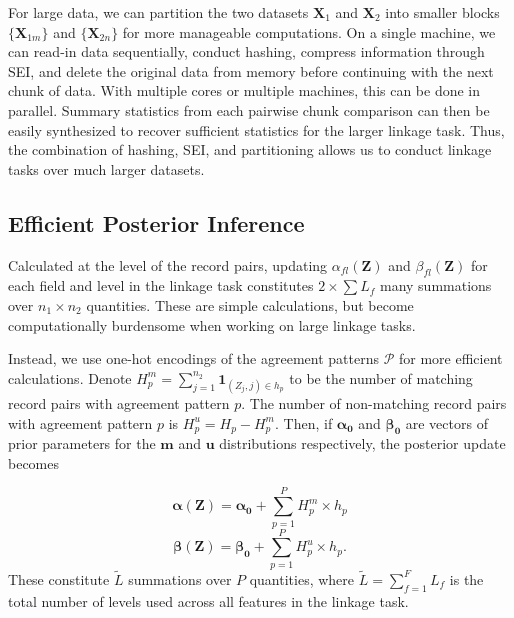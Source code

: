 \documentclass[ba]{imsart}
\begin{document}

For large data, we can partition the two datasets \(\bm{X}_1\) and
\(\bm{X}_2\) into smaller blocks \(\{\bm{X}_{1m}\}\) and \(\{\bm{X}_{2n}\}\) for more
manageable computations. On a single machine, we can read-in data
sequentially, conduct hashing, compress information through SEI, and
delete the original data from memory before continuing with the next
chunk of data. With multiple cores or multiple machines, this can be
done in parallel. Summary statistics from each pairwise chunk comparison can then be easily synthesized to recover sufficient statistics for the larger linkage task.  Thus, the combination of hashing, SEI, and partitioning
allows us to conduct linkage tasks over much larger datasets.

\hypertarget{efficient-posterior}{%
	\subsection{Efficient Posterior Inference }\label{efficient-posterior}}

Calculated at the level of the record pairs, updating  \(\alpha_{fl}(\bm{Z})\) and \(\beta_{fl}(\bm{Z})\) for each field and level in the linkage task constitutes \(2 \times \sum L_f\) many summations over \(n_1 \times n_2\) quantities. These are simple calculations, but become computationally burdensome when working on large linkage tasks. 

Instead, we use one-hot encodings of the agreement patterns $\mathcal{P}$ for more efficient calculations. Denote $H_p^m = \sum_{j=1}^{n_2} \bm{1}_{(Z_j, j) \in h_p}$ to be the number of matching record pairs with agreement pattern $p$. The number of non-matching record pairs with agreement pattern $p$ is \(H_p^u = H_p - H_p^m\). Then, if $\bm{\alpha_0}$ and $\bm{\beta_0}$ are vectors of prior parameters for the $\bm{m}$ and $\bm{u}$ distributions respectively, the posterior update becomes

$$\bm{\alpha(Z)} = \bm{\alpha_0} + \sum_{p=1}^P H_p^m \times h_p$$
$$\bm{\beta(Z)} = \bm{\beta_0} + \sum_{p=1}^P H_p^u \times h_p.$$
These constitute $\tilde{L}$ summations over $P$ quantities, where $\tilde{L} = \sum_{f=1}^F L_f$ is the total number of levels used across all features in the linkage task.
\end{document}
